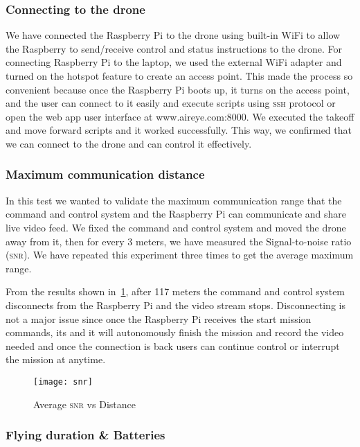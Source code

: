 \documentclass[../main.tex]{subfiles}
\begin{document}
\subsubsection{Connecting to the drone}

We have connected the
Raspberry Pi to the drone using built-in WiFi
to allow the Raspberry to send/receive control and status 
instructions to the drone. 
For connecting Raspberry Pi to the laptop, 
we used the external WiFi adapter and turned 
on the hotspot feature to create an access point.
This made the process so convenient because 
once the Raspberry Pi boots up, it turns on the 
access point, and the user can connect to it 
easily and execute scripts using \textsc{ssh} 
protocol or open the web app user interface 
at www.aireye.com:8000. We executed the takeoff 
and move forward scripts and it worked successfully.
This way, we confirmed that we can connect to the drone and can control it effectively.

\subsubsection{Maximum communication distance}

In this test we wanted to validate the maximum communication range that
the command and control system and the Raspberry Pi can communicate
and share live video feed. We fixed the command and control system and moved
the drone away from it, then for every 3 meters, we have 
measured the Signal-to-noise ratio (\textsc{snr}).
We have repeated this experiment three times to get the average maximum range.

From the results shown in~\cref{fig:snr-vs-distance}, after 117 meters 
the command and control system disconnects from the Raspberry Pi
and the video stream stops. Disconnecting is not a major issue
since once the Raspberry Pi receives the start mission commands, its 
and it will autonomously finish the mission and record the video needed
and once the connection is back users can continue control or interrupt the mission
at anytime.
 
\begin{figure}[tbp]
	\centering
	\texttt{[image: snr]}
        \caption{Average \textsc{snr} vs Distance}
	\label{fig:snr-vs-distance}
\end{figure}

\subsubsection{Flying duration \& Batteries}
\end{document}
